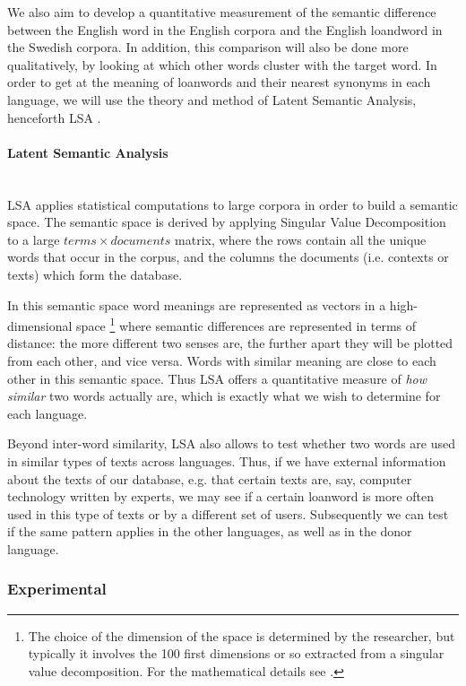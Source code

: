 \documentclass[a4paper]{article}
\begin{document}
We also aim to develop a quantitative measurement of the semantic difference between the English word in the English corpora and the English loandword in the Swedish corpora. In addition, this comparison will also be done more qualitatively, by looking at which other words cluster with the target word. 
In order to get at the meaning of loanwords and their nearest synonyms in each language, we will use the theory and method of Latent Semantic Analysis, henceforth LSA \citep[cf.][]{Deerwester1990,Landauer1998,Dumais2004}.

\paragraph{Latent Semantic Analysis} \hspace{0pt} \\
LSA applies statistical computations to large corpora in order to build a semantic space.
The semantic space is derived by applying Singular Value Decomposition to a large $ terms \times documents$ matrix, where the rows contain all the unique words that occur in the corpus, and the columns the documents (i.e. contexts or texts) which form the database.

In this semantic space word meanings are represented as vectors in a high-dimensional space%
\footnote{The choice of the dimension of the space is determined by the researcher, but typically it involves the 100 first dimensions or so extracted from a singular value decomposition. For the mathematical details see \citet{Deerwester1990}.} where semantic differences are represented in terms of distance: the more different two senses are, the further apart they will be plotted from each other, and vice versa. Words with similar meaning are close to each other in this semantic space.
Thus LSA offers a quantitative measure of \emph{how similar} two words actually are, which is exactly what we wish to determine for each language.

Beyond inter-word similarity, LSA also allows  to test whether two words are used in similar types of texts across languages.
Thus, if we have external information about the texts of our database, e.g. that certain texts are, say, computer technology written by experts, we may see if a certain loanword is more often used in this type of texts or by a different set of users.
Subsequently we can test if the same pattern applies in the other languages, as well as in the donor language.


\subsubsection{Experimental}
\label{subsect_experim}
\end{document}
